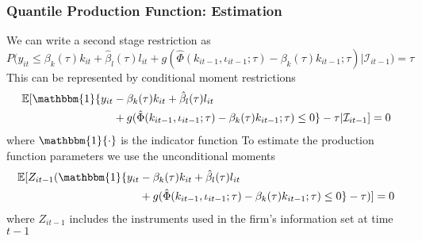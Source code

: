 \documentclass{beamer}
\begin{document}
\begin{frame}
\frametitle{Quantile Production Function: Estimation}
We can write a second stage restriction as
\begin{equation}
P\big(y_{it}\leq \beta_{k}(\tau)k_{it}+\hat{\beta}_{l}(\tau)l_{it}+g(\hat{\Phi}(k_{it-1}, \iota_{it-1}; \tau)-\beta_{k}(\tau)k_{it-1}; \tau)|\mathcal{I}_{it-1}\big)=\tau
\end{equation}
This can be represented by conditional moment restrictions
	\begin{equation}
	\begin{split}
	\mathbb{E}[\mathbbm{1}\{y_{it}&-\beta_{k}(\tau)k_{it}+\hat{\beta}_{l}(\tau)l_{it}\\
	&+g(\hat{\Phi}(k_{it-1}, \iota_{it-1}; \tau)-\beta_{k}(\tau)k_{it-1}; \tau)\leq 0\}-\tau|\mathcal{I}_{it-1}]=0
	\end{split}
	\end{equation}
	where $\mathbbm{1}\{\cdot\}$ is the indicator function
To estimate the production function parameters we use the unconditional moments
	\begin{equation}
	\begin{split}
	\mathbb{E}[Z_{it-1}(\mathbbm{1}\{y_{it}&-\beta_{k}(\tau)k_{it}+\hat{\beta}_{l}(\tau)l_{it}\\
	&+g(\hat{\Phi}(k_{it-1}, \iota_{it-1}; \tau)-\beta_{k}(\tau)k_{it-1}; \tau)\leq 0\}-\tau)]=0
	\end{split}
	\end{equation}
	where $Z_{it-1}$ includes the instruments used in the firm's information set at time $t-1$
	
\end{frame}
\end{document}
